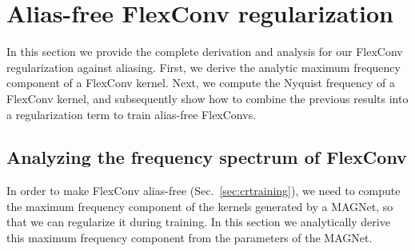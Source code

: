 \documentclass{article} \usepackage{iclr2022_conference,times}
\begin{document}
\section{Alias-free FlexConv regularization}
\label{sec:regularizingflexconv}
In this section we provide the complete derivation and analysis for our FlexConv regularization against aliasing. First, we derive the analytic maximum frequency component of a FlexConv kernel. Next, we compute the Nyquist frequency of a FlexConv kernel, and subsequently show how to combine the previous results into a regularization term to train alias-free FlexConvs.

\subsection{Analyzing the frequency spectrum of FlexConv}
\label{sec:magnetanalysis}

In order to make FlexConv alias-free (Sec.~\ref{sec:crtraining}), we need to compute the maximum frequency component of the kernels generated by a MAGNet, so that we can regularize it during training. In this section we analytically derive this maximum frequency component from the parameters of the MAGNet.
\end{document}
